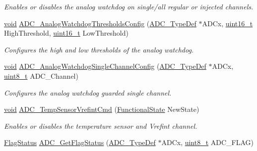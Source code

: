 \begin{DoxyCompactItemize}
\begin{DoxyCompactList}\small\item\em Enables or disables the analog watchdog on single/all regular or injected channels. \end{DoxyCompactList}\item 
\hyperlink{usb__devapi_8h_afabf60e7f57651d6d595a02c75f07cd0}{void} \hyperlink{group___a_d_c___exported___functions_ga79588d02aa8e4147f21cb90a4708366d}{A\+D\+C\+\_\+\+Analog\+Watchdog\+Thresholds\+Config} (\hyperlink{struct_a_d_c___type_def}{A\+D\+C\+\_\+\+Type\+Def} $\ast$A\+D\+Cx, \hyperlink{_p_e___types_8h_a1f1825b69244eb3ad2c7165ddc99c956}{uint16\+\_\+t} High\+Threshold, \hyperlink{_p_e___types_8h_a1f1825b69244eb3ad2c7165ddc99c956}{uint16\+\_\+t} Low\+Threshold)
\begin{DoxyCompactList}\small\item\em Configures the high and low thresholds of the analog watchdog. \end{DoxyCompactList}\item 
\hyperlink{usb__devapi_8h_afabf60e7f57651d6d595a02c75f07cd0}{void} \hyperlink{group___a_d_c___exported___functions_ga03cef3d12292ffa2b8520524d5b0226c}{A\+D\+C\+\_\+\+Analog\+Watchdog\+Single\+Channel\+Config} (\hyperlink{struct_a_d_c___type_def}{A\+D\+C\+\_\+\+Type\+Def} $\ast$A\+D\+Cx, \hyperlink{_p_e___types_8h_aba7bc1797add20fe3efdf37ced1182c5}{uint8\+\_\+t} A\+D\+C\+\_\+\+Channel)
\begin{DoxyCompactList}\small\item\em Configures the analog watchdog guarded single channel. \end{DoxyCompactList}\item 
\hyperlink{usb__devapi_8h_afabf60e7f57651d6d595a02c75f07cd0}{void} \hyperlink{group___a_d_c___exported___functions_ga848682e2d7d3de9f8cf03ffa4c11f0b5}{A\+D\+C\+\_\+\+Temp\+Sensor\+Vrefint\+Cmd} (\hyperlink{agilefox_2library_2inc_2stm32f10x__type_8h_ac9a7e9a35d2513ec15c3b537aaa4fba1}{Functional\+State} New\+State)
\begin{DoxyCompactList}\small\item\em Enables or disables the temperature sensor and Vrefint channel. \end{DoxyCompactList}\item 
\hyperlink{agilefox_2library_2inc_2stm32f10x__type_8h_a89136caac2e14c55151f527ac02daaff}{Flag\+Status} \hyperlink{group___a_d_c___exported___functions_gaa12546e51ec905c90a3aada432bd4633}{A\+D\+C\+\_\+\+Get\+Flag\+Status} (\hyperlink{struct_a_d_c___type_def}{A\+D\+C\+\_\+\+Type\+Def} $\ast$A\+D\+Cx, \hyperlink{_p_e___types_8h_aba7bc1797add20fe3efdf37ced1182c5}{uint8\+\_\+t} A\+D\+C\+\_\+\+F\+L\+AG)

\end{DoxyCompactItemize}

